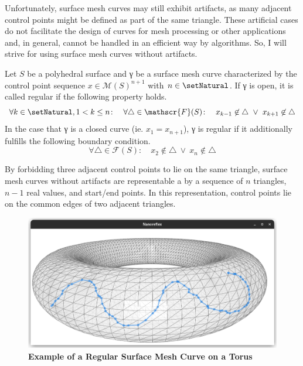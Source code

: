 \documentclass{stdlocal}
\begin{document}

  Unfortunately, surface mesh curves may still exhibit artifacts, as many adjacent control points might be defined as part of the same triangle.
  These artificial cases do not facilitate the design of curves for mesh processing or other applications and, in general, cannot be handled in an efficient way by algorithms.
  So, I will strive for using surface mesh curves without artifacts.

  \begin{definition}
    Let $S$ be a polyhedral surface and γ be a surface mesh curve characterized by the control point sequence $x\in\mathscr{M}(S)^{n+1}$ with $n\in\setNatural$.
    If γ is open, it is called regular if the following property holds.
    \[
      \forall k\in\setNatural, 1 < k \leq n\colon \quad
      \forall \triangle\in\mathscr{F}(S) \colon \quad x_{k-1}\not\in\triangle \ \vee\  x_{k+1}\not\in\triangle
    \]
    In the case that γ is a closed curve (ie. $x_1 = x_{n+1}$), γ is regular if it additionally fulfills the following boundary condition.
    \[
      \forall \triangle\in\mathscr{F}(S) \colon \quad x_{2}\not\in\triangle \ \vee\  x_{n}\not\in\triangle
    \]
  \end{definition}
  By forbidding three adjacent control points to lie on the same triangle, surface mesh curves without artifacts are representable a by a sequence of $n$ triangles, $n-1$ real values, and start/end points.
  In this representation, control points lie on the common edges of two adjacent triangles.

  \begin{figure}
    \centering
    \includegraphics[width=0.8\linewidth,trim={15px 20 25 50},clip]{images/surface-mesh-curve-torus.png}
    \caption[Example of a Regular Surface Mesh Curve on a Torus]{%
      \textbf{Example of a Regular Surface Mesh Curve on a Torus}\\
    }
    \label{fig:surface-mesh-curve-example}
  \end{figure}
\end{document}
